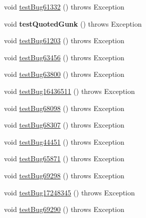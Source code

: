 \begin{DoxyCompactItemize}
\item 
void \mbox{\hyperlink{classtestsuite_1_1regression_1_1_meta_data_regression_test_aaf434af6a2a4b3cc948e8973837c8cca}{test\+Bug61332}} ()  throws Exception 
\item 
\mbox{\label{classtestsuite_1_1regression_1_1_meta_data_regression_test_aad58713a1f82200b0cbfa647caf0a130}} 
void {\bfseries test\+Quoted\+Gunk} ()  throws Exception 
\item 
void \mbox{\hyperlink{classtestsuite_1_1regression_1_1_meta_data_regression_test_a0dd9e6de4ad836964f235a4a27aed144}{test\+Bug61203}} ()  throws Exception 
\item 
void \mbox{\hyperlink{classtestsuite_1_1regression_1_1_meta_data_regression_test_a8d8e4af7ca8136d86aa2ea60237ceb89}{test\+Bug63456}} ()  throws Exception 
\item 
void \mbox{\hyperlink{classtestsuite_1_1regression_1_1_meta_data_regression_test_af38b67a5bf6e3396cd891b3f8b4d2c8f}{test\+Bug63800}} ()  throws Exception 
\item 
void \mbox{\hyperlink{classtestsuite_1_1regression_1_1_meta_data_regression_test_a1fd3d694ae818586b9e77cceb5bfbbb3}{test\+Bug16436511}} ()  throws Exception 
\item 
void \mbox{\hyperlink{classtestsuite_1_1regression_1_1_meta_data_regression_test_a70f7534e3db316950ae32e2142e9ade2}{test\+Bug68098}} ()  throws Exception 
\item 
void \mbox{\hyperlink{classtestsuite_1_1regression_1_1_meta_data_regression_test_a7546dce3979e1d5f2f28703337b00e62}{test\+Bug68307}} ()  throws Exception 
\item 
void \mbox{\hyperlink{classtestsuite_1_1regression_1_1_meta_data_regression_test_ad048c86a8dc4f574eae4004473ceaa6f}{test\+Bug44451}} ()  throws Exception 
\item 
void \mbox{\hyperlink{classtestsuite_1_1regression_1_1_meta_data_regression_test_a8cde8eefe9689a7113484b6de4827afd}{test\+Bug65871}} ()  throws Exception 
\item 
void \mbox{\hyperlink{classtestsuite_1_1regression_1_1_meta_data_regression_test_a1367bf2ebe3a308c3d374e28648699fc}{test\+Bug69298}} ()  throws Exception 
\item 
void \mbox{\hyperlink{classtestsuite_1_1regression_1_1_meta_data_regression_test_a5eb8eb8d010b18e3193a85380d5483ba}{test\+Bug17248345}} ()  throws Exception 
\item 
void \mbox{\hyperlink{classtestsuite_1_1regression_1_1_meta_data_regression_test_a415c490c795a8501bb347c435a223360}{test\+Bug69290}} ()  throws Exception 

\end{DoxyCompactItemize}
